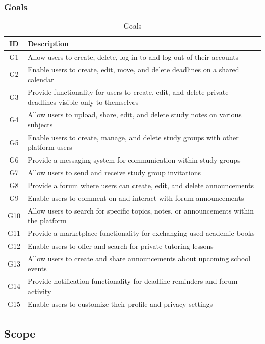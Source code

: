 \documentclass{article}
\begin{document}
\subsubsection{Goals}
\begin{table}[h!]
\centering
\begin{tabular}{|c|p{10cm}|}
    \textbf{ID} & \textbf{Description} \\
    \hline
    G1 & Allow users to create, delete, log in to and log out of their accounts \\
    G2 & Enable users to create, edit, move, and delete deadlines on a shared calendar \\
    G3 & Provide functionality for users to create, edit, and delete private deadlines visible only to themselves \\
    G4 & Allow users to upload, share, edit, and delete study notes on various subjects \\
    G5 & Enable users to create, manage, and delete study groups with other platform users \\
    G6 & Provide a messaging system for communication within study groups \\
    G7 & Allow users to send and receive study group invitations \\
    G8 & Provide a forum where users can create, edit, and delete announcements \\
    G9 & Enable users to comment on and interact with forum announcements \\
    G10 & Allow users to search for specific topics, notes, or announcements within the platform \\
    G11 & Provide a marketplace functionality for exchanging used academic books \\
    G12 & Enable users to offer and search for private tutoring lessons \\
    G13 & Allow users to create and share announcements about upcoming school events \\
    G14 & Provide notification functionality for deadline reminders and forum activity \\
    G15 & Enable users to customize their profile and privacy settings \\
    \hline
    \end{tabular}
\caption{Goals}
\label{tab:goals}
\end{table}
\clearpage
\subsection{Scope}
\end{document}
